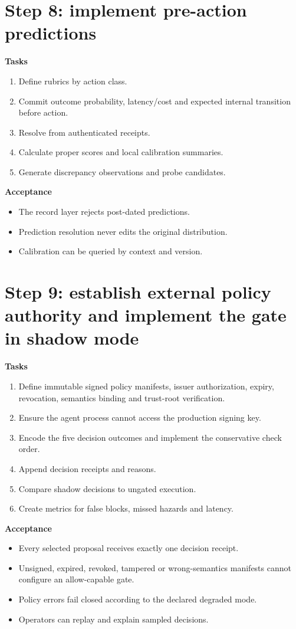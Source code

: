 \documentclass[11pt,oneside]{report}
\begin{document}
\section{Step 8: implement pre-action predictions}

\textbf{Tasks}
\begin{enumerate}
  \item Define rubrics by action class.
  \item Commit outcome probability, latency/cost and expected internal transition before action.
  \item Resolve from authenticated receipts.
  \item Calculate proper scores and local calibration summaries.
  \item Generate discrepancy observations and probe candidates.
\end{enumerate}

\textbf{Acceptance}
\begin{itemize}
  \item The record layer rejects post-dated predictions.
  \item Prediction resolution never edits the original distribution.
  \item Calibration can be queried by context and version.
\end{itemize}

\section{Step 9: establish external policy authority and implement the gate in shadow mode}

\textbf{Tasks}
\begin{enumerate}
  \item Define immutable signed policy manifests, issuer authorization, expiry, revocation, semantics binding and trust-root verification.
  \item Ensure the agent process cannot access the production signing key.
  \item Encode the five decision outcomes and implement the conservative check order.
  \item Append decision receipts and reasons.
  \item Compare shadow decisions to ungated execution.
  \item Create metrics for false blocks, missed hazards and latency.
\end{enumerate}

\textbf{Acceptance}
\begin{itemize}
  \item Every selected proposal receives exactly one decision receipt.
  \item Unsigned, expired, revoked, tampered or wrong-semantics manifests cannot configure an allow-capable gate.
  \item Policy errors fail closed according to the declared degraded mode.
  \item Operators can replay and explain sampled decisions.
\end{itemize}
\end{document}
